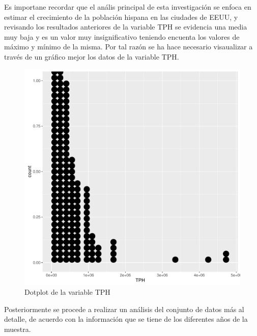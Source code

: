 Es importane recordar que el anális principal de esta investigación se enfoca en estimar el crecimiento de la población hispana en las ciudades de EEUU, y revisando los resultados anteriores de la variable TPH se evidencia una media muy baja y es un valor muy insignificativo teniendo encuenta los valores de máximo y mínimo de la misma.  Por tal razón se ha hace necesario visaualizar a través de un gráfico mejor los datos de la variable TPH.   

\begin{figure}[H]
	\centering
\begin{knitrout}
\color{fgcolor}\begin{kframe}
\begin{alltt}
        \hlstd{(}\hlstd{))} \hlopt{+} \hlstd{()}
\end{alltt}
\end{kframe}
\includegraphics[width=\maxwidth]{figure/atipicos-1} 

\end{knitrout}
	\caption{Dotplot de la variable TPH}
\end{figure}


Posteriormente se procede a realizar un análisis del conjunto de datos más al detalle, de acuerdo con la información que se tiene de los diferentes años de la muestra.

